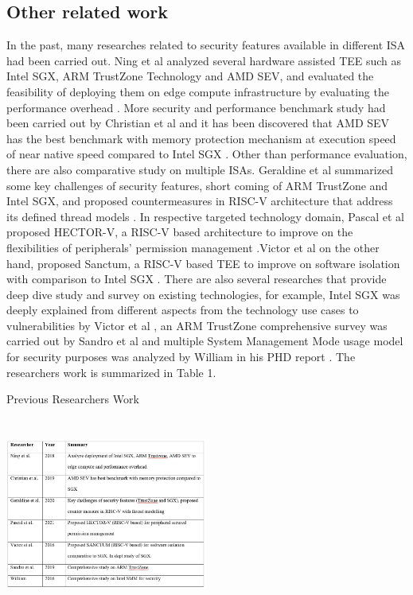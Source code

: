 \documentclass[a4paper,fleqn]{cas-dc}
\begin{document}
\subsection{ Other related work}
In the past, many researches related to security features available in different ISA had been carried out.
Ning et al analyzed several hardware assisted TEE such as Intel SGX, ARM TrustZone Technology
and AMD SEV, and evaluated the feasibility of deploying them on edge compute infrastructure by evaluating the performance overhead \cite{R5:2}.
More security and performance benchmark study had been carried out by Christian et al and it has been discovered that AMD SEV has the best benchmark with memory protection mechanism at execution speed of near native speed compared to Intel SGX \cite{R5:3}.
Other than performance evaluation, there are also comparative study on multiple ISAs. Geraldine et
al summarized some key challenges of security features, short coming of ARM TrustZone and Intel SGX, and proposed countermeasures in RISC-V architecture that address its defined thread models \cite{R5:4}.
In respective targeted technology domain, Pascal et al proposed HECTOR-V, a RISC-V based architecture to improve on the flexibilities of peripherals’ permission management \cite{R5:5}.Victor et al on the other hand, proposed Sanctum, a RISC-V based TEE to improve on software isolation with comparison to Intel SGX  \cite{R5:6}. There are also several researches that provide deep dive study and survey on existing technologies, for example, Intel SGX was deeply explained from different aspects from the technology use cases to vulnerabilities by Victor et al \cite{R5:7}, an ARM TrustZone comprehensive survey was carried out by Sandro et al \cite{R5:8} and multiple System Management Mode usage model for security purposes was analyzed by William in his PHD report \cite{R5:9}. The researchers work is summarized in Table 1.

\begin{table}[hbt!]
	\caption{Previous Researchers Work}
	\centering
	\includegraphics[width=0.5\textwidth,height=2.5in]{figs/PreviousResearchersWork.JPG}
\end{table}
\end{document}
